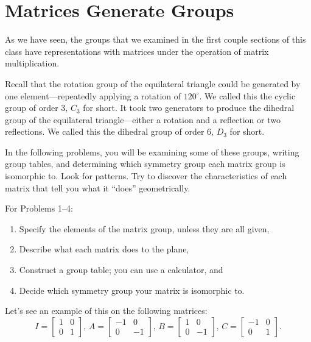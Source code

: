 \documentclass[../gatm.tex]{subfiles}
\begin{document}
\section{Matrices Generate Groups}
\setcounter{problem_i}{0}

As we have seen, the groups that we examined in the first couple sections of this class have representations with matrices under the operation of matrix multiplication.

Recall that the rotation group of the equilateral triangle could be generated by one element---repeatedly applying a rotation of $120^\circ$. We called this the cyclic group of order $3$, $C_3$ for short. It took two generators to produce the dihedral group of the equilateral triangle---either a rotation and a reflection or two reflections. We called this the dihedral group of order $6$, $D_3$ for short.

In the following problems, you will be examining some of these groups, writing group tables, and determining which symmetry group each matrix group is isomorphic to. Look for patterns. Try to discover the characteristics of each matrix that tell you what it ``does'' geometrically.

For Problems 1--4:
\begin{enumerate}[label=(\alph*)]
\item Specify the elements of the matrix group, unless they are all given,
\item Describe what each matrix does to the plane,
\item Construct a group table; you can use a calculator, and
\item Decide which symmetry group your matrix is isomorphic to.
\end{enumerate}

\noindent Let's see an example of this on the following matrices:
$$I=\left[\begin{array}{cc} 1 & 0 \\ 0 & 1 \end{array}\right],\, A=\left[\begin{array}{cc} -1 & 0 \\ 0 & -1 \end{array}\right],\,  B=\left[\begin{array}{cc} 1 & 0 \\ 0 & -1 \end{array}\right],\, C=\left[\begin{array}{cc} -1 & 0 \\ 0 & 1 \end{array}\right].$$
\end{document}
